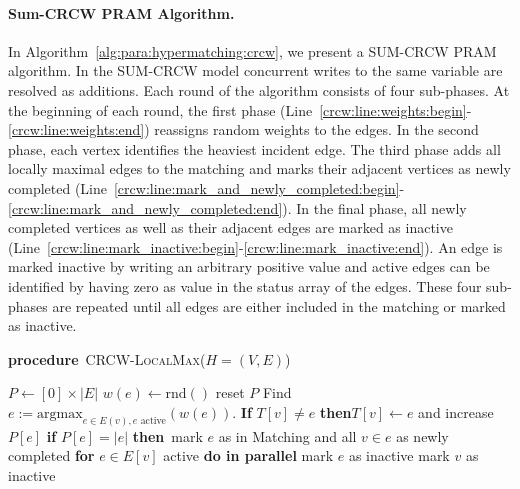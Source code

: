 \documentclass[runningheads]{llncs}
\makeatletter
\newcommand\algorithmicprocedure{\textbf{procedure}}
\newcommand{\algorithmicendprocedure}{\algorithmicend\ \algorithmicprocedure}
\newcommand\PROCEDURE[3][default]{%
  \ALC@it
  \algorithmicprocedure\ \textsc{#2}(#3)%
  \ALC@com{#1}%
  \begin{ALC@prc}%
}
\newcommand\ENDPROCEDURE{%
  \end{ALC@prc}%
  \ifthenelse{\boolean{ALC@noend}}{}{%
    \ALC@it\algorithmicendprocedure
  }%
}
\newenvironment{ALC@prc}{\begin{ALC@g}}{\end{ALC@g}}
\makeatother
\begin{document}
\paragraph{Sum-CRCW PRAM Algorithm.} \label{CRCW_PRAM_ALGORITHM}
In Algorithm~\ref{alg:para:hypermatching:crcw}, we present a SUM-CRCW PRAM algorithm.
In the SUM-CRCW model concurrent writes to the same variable are resolved as additions.
Each round of the algorithm consists of four sub-phases. At the beginning of each round, the first phase (Line~\ref{crcw:line:weights:begin}-\ref{crcw:line:weights:end}) reassigns random weights to the edges. In the second phase, each vertex identifies the heaviest incident edge. %
The third phase adds all locally maximal edges to the matching and marks their adjacent vertices as newly completed (Line~\ref{crcw:line:mark_and_newly_completed:begin}-\ref{crcw:line:mark_and_newly_completed:end}). In the final phase, all newly completed vertices as well as their adjacent edges are marked as inactive (Line~\ref{crcw:line:mark_inactive:begin}-\ref{crcw:line:mark_inactive:end}).
An edge is marked inactive by writing an arbitrary positive value and active edges can be identified by having zero as value in the status array of the edges.
These four sub-phases are repeated until all edges are either included in the matching or marked as inactive.


\begin{algorithm}[t]
        \caption{CRCW PRAM Algorithm for Hypergraph Matching}
        \label{alg:para:hypermatching:crcw}
        {\footnotesize
        \begin{algorithmic}[1]
        \PROCEDURE{CRCW-LocalMax}{$H=(V,E)$}
        \STATE $P\gets [0]\times \left|E\right|$ 
        \label{crcw:line:weights:begin}
        \STATE $w(e)\gets \mathrm{rnd()}$ 
        \ENDFOR \label{crcw:line:weights:end}
        \STATE reset $P$
         \label{crcw:line:maximal_edges:begin}
        \STATE  Find $e:=\mathrm{argmax}_{e\in E(v), e\text{ active}}(w(e))$.
        \STATE \textbf{If} $T[v]\neq e$ \textbf{then}\quad  $T[v] \gets e$ and increase $P[e]$ 
        \ENDFOR\label{crcw:line:maximal_edges:end}
         \label{crcw:line:mark_and_newly_completed:begin}
        \STATE\textbf{if} $P[e]=\left| e\right|$ \textbf{then}\,  mark $e$ as in Matching and all $v \in e$ as newly completed\label{crcw:line:mark_and_newly_completed:end}
        \ENDFOR
        \label{crcw:line:mark_inactive:begin}
        \STATE \textbf{for} $e \in E[v]$ active \textbf{do in parallel} mark $e$ as inactive \label{crcw:line:set_edges_inactive}
        \ENDIF
        \STATE mark $v$ as inactive
        \ENDFOR \label{crcw:line:mark_inactive:end}
        \ENDWHILE
        \ENDPROCEDURE
    \end{algorithmic}}
    \end{algorithm}
\end{document}

